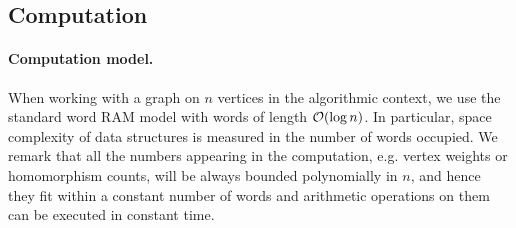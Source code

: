 



	


\subsection{Computation}

\paragraph*{Computation model.} When working with a graph on $n$ vertices in the algorithmic context, we use the standard word RAM model with words of length $\mathcal{O}(\log n)$. In particular, space complexity of data structures is measured in the number of words occupied. We remark that all the numbers appearing in the computation, e.g. vertex weights or homomorphism counts, will be always bounded polynomially in $n$, and hence they fit within a constant number of words and arithmetic operations on them can be executed in constant time.


